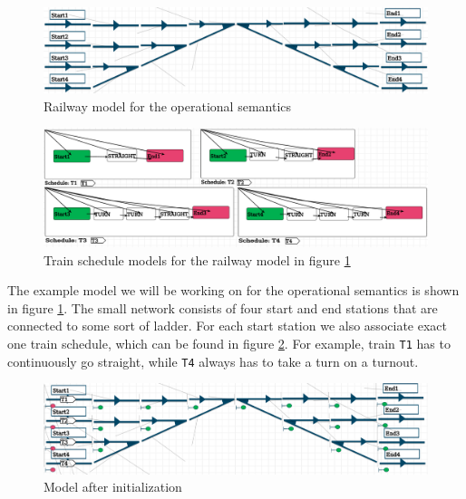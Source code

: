 \documentclass{article}
\begin{document}
\begin{figure}[H]
    \centering
    \includegraphics[width=\textwidth]{images/example_devs_railway.png}
    \caption{Railway model for the operational semantics}
    \label{example_devs_railway}
\end{figure}

\begin{figure}[H]
    \centering
    \includegraphics[width=\textwidth]{images/example_devs_schedule.png}
    \caption{Train schedule models for the railway model in figure \ref{example_devs_railway}}
    \label{example_devs_schedule}
\end{figure}

The example model we will be working on for the operational semantics is shown in figure \ref{example_devs_railway}. The small network consists of four start and end stations that are connected to some sort of ladder. For each start station we also associate exact one train schedule, which can be found in figure \ref{example_devs_schedule}. For example, train \texttt{T1} has to continuously go straight, while \texttt{T4} always has to take a turn on a turnout.

\begin{figure}[H]
    \centering
    \includegraphics[width=\textwidth]{images/example_devs_after_init.png}
    \caption{Model after initialization}
    \label{example_devs_after_init}
\end{figure}
\end{document}
